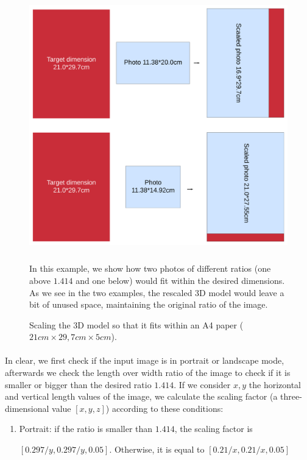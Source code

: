 \documentclass[12pt, letterpaper]{article}
\begin{document}
\begin{spacing}{1.15}
\begin{figure}[!ht]
    \begin{center}
        \includegraphics[height = 11cm]{resize.pdf}
        \caption{Scaling the 3D model so that it fits within an A4 paper ($21cm\times29,7cm\times5cm$).}
        \label{resize}
    \end{center}
    \small
    In this example, we show how two photos of different ratios (one above $1.414$ and one below) would fit within the desired dimensions. As we see in
    the two examples, the rescaled 3D model would leave a bit of unused space, maintaining the original ratio of the image.
\end{figure}

\paragraph{}
In clear, we first check if the input image is in portrait or landscape mode, afterwards we check the length over width ratio of the image to check if it is smaller or 
bigger than the desired ratio $1.414$. If we consider $x, y$ the horizontal and vertical length values of the image, we calculate the scaling factor (a three-dimensional value $[x, y, z]$) 
according to these conditions:
\begin{enumerate}
    \item Portrait: if the ratio is smaller than $1.414$, the scaling factor is

    \([0.297/y, 0.297/y, 0.05]\). Otherwise, it is equal to $[0.21/x, 0.21/x, 0.05]$


\end{enumerate}
\end{spacing}
\end{document}
